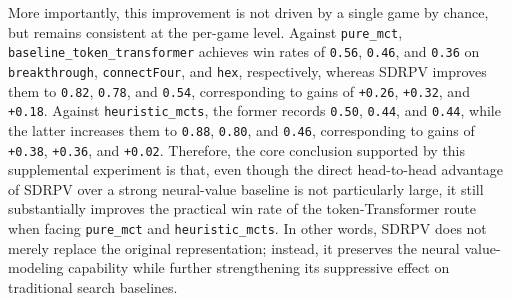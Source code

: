 More importantly, this improvement is not driven by a single game by chance, but remains consistent at the per-game level. Against \texttt{pure_mct}, \texttt{baseline_token_transformer} achieves win rates of \texttt{0.56}, \texttt{0.46}, and \texttt{0.36} on \texttt{breakthrough}, \texttt{connectFour}, and \texttt{hex}, respectively, whereas SDRPV improves them to \texttt{0.82}, \texttt{0.78}, and \texttt{0.54}, corresponding to gains of \texttt{+0.26}, \texttt{+0.32}, and \texttt{+0.18}. Against \texttt{heuristic_mcts}, the former records \texttt{0.50}, \texttt{0.44}, and \texttt{0.44}, while the latter increases them to \texttt{0.88}, \texttt{0.80}, and \texttt{0.46}, corresponding to gains of \texttt{+0.38}, \texttt{+0.36}, and \texttt{+0.02}. Therefore, the core conclusion supported by this supplemental experiment is that, even though the direct head-to-head advantage of SDRPV over a strong neural-value baseline is not particularly large, it still substantially improves the practical win rate of the token-Transformer route when facing \texttt{pure_mct} and \texttt{heuristic_mcts}. In other words, SDRPV does not merely replace the original representation; instead, it preserves the neural value-modeling capability while further strengthening its suppressive effect on traditional search baselines.



